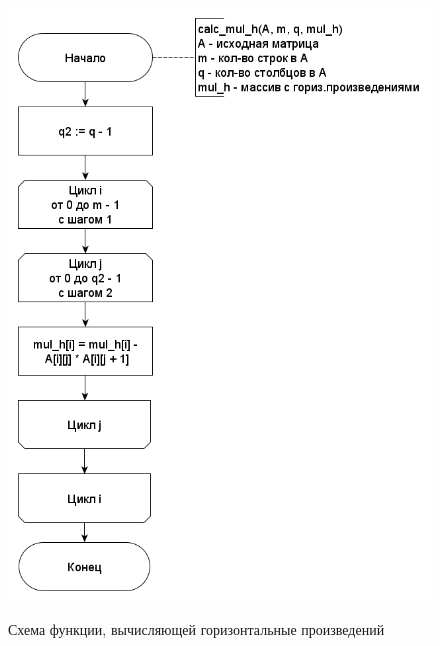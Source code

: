 \documentclass[a4paper,14pt]{article}
\begin{document}
	    	    \begin{figure}[h!]
	    	\begin{center}
	    		{\includegraphics[scale = 0.5]{mul_h.png}}
	    		\caption{Схема функции, вычисляющей горизонтальные произведений}
	    		\label{fig:schema_h}
	    	\end{center}
	    \end{figure}
	    
\end{document}
